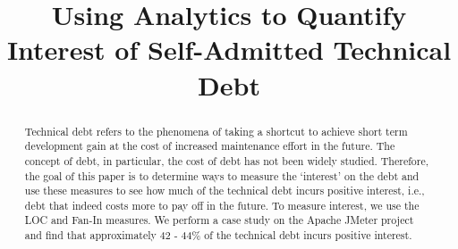 \documentclass[conference]{IEEEtran}
\begin{document}
\title{Using Analytics to Quantify Interest of Self-Admitted Technical Debt}

\author{
}

\maketitle

\begin{abstract}
Technical debt refers to the phenomena of taking a shortcut to achieve short term development gain at the cost of increased maintenance effort in the future. The concept of debt, in particular, the cost of debt has not been widely studied. Therefore, the goal of this paper is to determine ways to measure the `interest' on the debt and use these measures to see how much of the technical debt incurs positive interest, i.e., debt that indeed costs more to pay off in the future. To measure interest, we use the LOC and Fan-In measures. We perform a case study on the Apache JMeter project and find that approximately 42 - 44\% of the technical debt incurs positive interest.
\end{abstract}

\IEEEpeerreviewmaketitle

\begin{comment}
2 tomato: let's finish results (how to show)
2 tomato: read related work to get knowledge and good motivation for RQ1 and RQ2.

- slide:
2 tomato (one topic of current)
2 tomato (one topic of current)
\end{comment}
\end{document}
